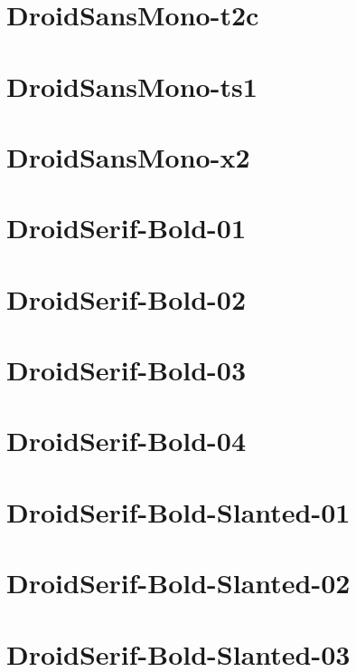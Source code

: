 \documentclass{article}
\begin{document}
\section{DroidSansMono-t2c}

\section{DroidSansMono-ts1}

\section{DroidSansMono-x2}

\section{DroidSerif-Bold-01}

\section{DroidSerif-Bold-02}

\section{DroidSerif-Bold-03}

\section{DroidSerif-Bold-04}

\section{DroidSerif-Bold-Slanted-01}

\section{DroidSerif-Bold-Slanted-02}

\section{DroidSerif-Bold-Slanted-03}
\end{document}
